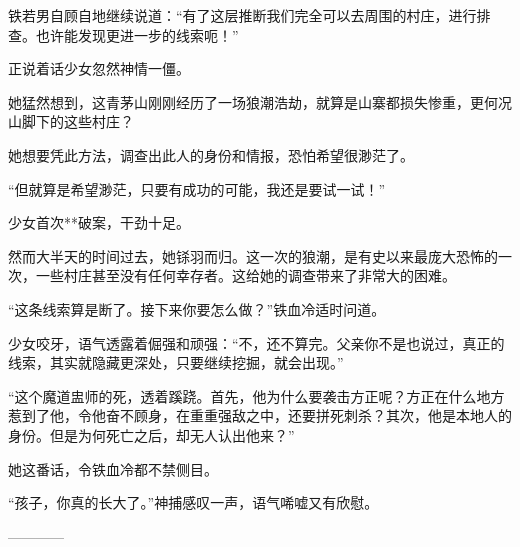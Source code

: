 \begin{this_body}
铁若男自顾自地继续说道：“有了这层推断我们完全可以去周围的村庄，进行排查。也许能发现更进一步的线索呃！”

正说着话少女忽然神情一僵。

她猛然想到，这青茅山刚刚经历了一场狼潮浩劫，就算是山寨都损失惨重，更何况山脚下的这些村庄？

她想要凭此方法，调查出此人的身份和情报，恐怕希望很渺茫了。

“但就算是希望渺茫，只要有成功的可能，我还是要试一试！”

少女首次**破案，干劲十足。

然而大半天的时间过去，她铩羽而归。这一次的狼潮，是有史以来最庞大恐怖的一次，一些村庄甚至没有任何幸存者。这给她的调查带来了非常大的困难。

“这条线索算是断了。接下来你要怎么做？”铁血冷适时问道。

少女咬牙，语气透露着倔强和顽强：“不，还不算完。父亲你不是也说过，真正的线索，其实就隐藏更深处，只要继续挖掘，就会出现。”

“这个魔道盅师的死，透着蹊跷。首先，他为什么要袭击方正呢？方正在什么地方惹到了他，令他奋不顾身，在重重强敌之中，还要拼死刺杀？其次，他是本地人的身份。但是为何死亡之后，却无人认出他来？”

她这番话，令铁血冷都不禁侧目。

“孩子，你真的长大了。”神捕感叹一声，语气唏嘘又有欣慰。

------------

\end{this_body}

